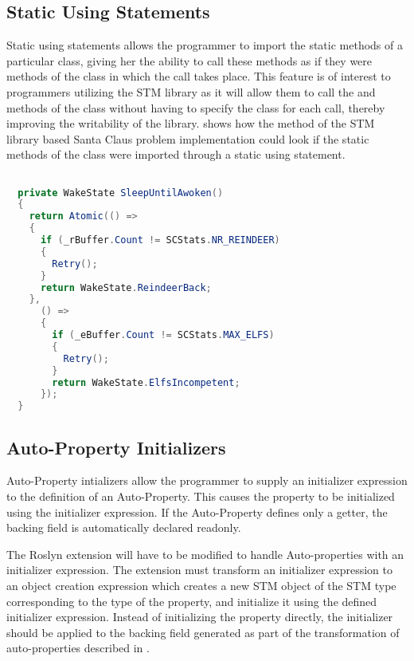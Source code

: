 \subsection{Static Using Statements}
Static using statements allows the programmer to import the static methods of a particular class, giving her the ability to call these methods as if they were methods of the class in which the call takes place\cite{csharp6one}\cite{csharp6featureDescription}. This feature is of interest to programmers utilizing the \ac{STM} library as it will allow them to call the  and  methods of the  class without having to specify the class for each call, thereby improving the writability of the library.  shows how the  method of the \ac{STM} library based Santa Claus problem implementation could look if the static methods of the  class were imported through a static using statement.

\begin{lstlisting}[float,label=lst:static_using_example,
  caption={\ac{STM} library with static using statement},
  language=Java,  
  showspaces=false,
  showtabs=false,
  breaklines=true,
  showstringspaces=false,
  breakatwhitespace=true,
  escapechar=~,
  commentstyle=\color{greencomments},
  keywordstyle=\color{bluekeywords},
  stringstyle=\color{redstrings},
  morekeywords={atomic, retry, orelse, var, get, set, ref, out}]  % Start your code-block

  private WakeState SleepUntilAwoken()
  {
    return Atomic(() =>
    {
      if (_rBuffer.Count != SCStats.NR_REINDEER)
      {
        Retry();
      }
      return WakeState.ReindeerBack;
    },
      () =>
      {
        if (_eBuffer.Count != SCStats.MAX_ELFS)
        {
          Retry();
        }
        return WakeState.ElfsIncompetent;
      });
  }
\end{lstlisting}

\subsection{Auto-Property Initializers}
Auto-Property intializers allow the programmer to supply an initializer expression to the definition of an Auto-Property\cite{csharp6one}\cite{csharp6two}\cite{csharp6featureDescription}. This causes the property  to be initialized using the initializer expression. If the Auto-Property defines only a getter, the backing field is automatically declared readonly\cite{csharp6one}\cite{csharp6featureDescription}.

The Roslyn extension will have to be modified to handle  Auto-properties with an initializer expression. The extension must transform an initializer expression to an object creation expression which creates a new \ac{STM} object of the \ac{STM} type corresponding to the type of the  property, and initialize it using the defined initializer expression. Instead of initializing the property directly, the initializer should be applied to the backing field generated as part of the transformation of  auto-properties described in .

\worksheetend
